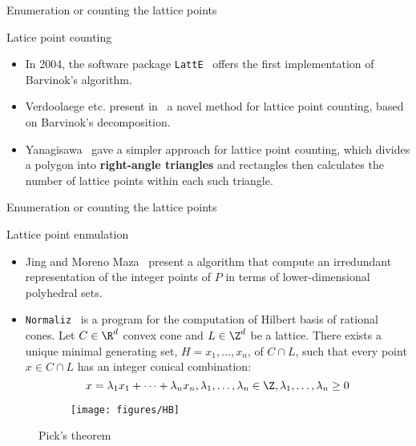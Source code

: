 \begin{frame}{Enumeration or counting the lattice points}
	\begin{block}{Latice point counting}
		\begin{itemize}
			\item In 2004, the software package {\tt LattE}~\cite{DBLP:journals/jsc/LoeraHTY04} offers the first implementation of Barvinok's algorithm.
			\item Verdoolaege etc.
			present in~\cite{DBLP:journals/algorithmica/VerdoolaegeSBLB07}
			a novel method for lattice point counting, based on Barvinok's
			decomposition.
			\item Yanagisawa~\cite{yanagisawa2005simple} gave a simpler approach for lattice
			point counting, which divides a polygon into {\bf right-angle
				triangles} and rectangles then calculates the number of lattice points within 
			each such triangle.
		\end{itemize}
	\end{block}
\end{frame}


\begin{frame}{Enumeration or counting the lattice points}
	\begin{block}{Lattice point enmulation}
		\begin{itemize}
			\item Jing and Moreno Maza~\cite{DBLP:conf/casc/JingM17} present a algorithm that compute an irredundant representation of the integer points of $P$ in terms of lower-dimensional polyhedral sets.
			\item {\tt Normaliz}~\cite{bruns2010normaliz} is a program for the computation of Hilbert basis of rational cones. 
			 Let $C \in \R^d$ convex cone  and $L \in \Z^d$ be a lattice. There exists a unique minimal generating set, $H = {x_1,\ldots,x_n}$, of $ C \cap L$, such that every point $x \in C \cap L$ has an integer conical combination:
			\[x = \lambda_1x_1 + \cdots + \lambda_nx_n, \lambda_1,\ldots,\lambda_n \in \Z, \lambda_1,\ldots,\lambda_n \ge 0\]
		\end{itemize}
		\begin{figure}[H]
		\centering %
			\begin{figure}[H]
				\texttt{[image: figures/HB]}
			\end{figure}
			\caption{Pick's theorem}
	\end{figure}
	\end{block}
\end{frame}

